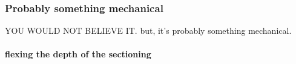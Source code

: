 \subsubsection{Probably something mechanical}
YOU WOULD NOT BELIEVE IT. but, it's probably something mechanical.

\vspace{1cm}
\paragraph{flexing the depth of the sectioning}
